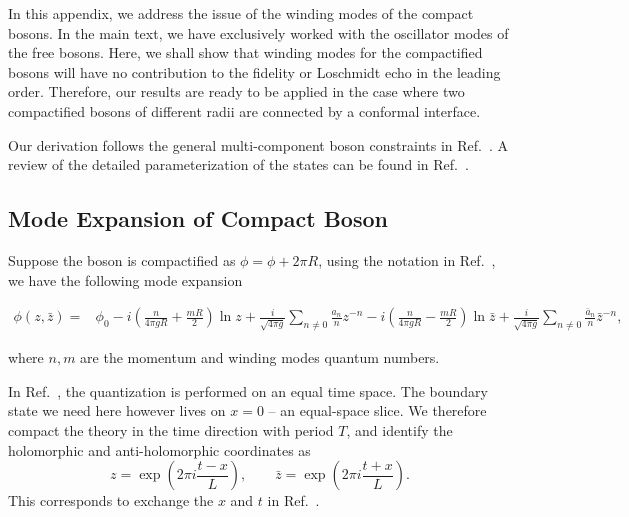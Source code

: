 
In this appendix, we address the issue of the winding modes of the compact bosons. In the main text, we have exclusively worked with the oscillator modes of the free bosons. Here, we shall show that winding modes for the compactified bosons will have no contribution to the fidelity or Loschmidt echo in the leading order. Therefore, our results are ready to be applied in the case where two compactified bosons of different radii are connected by a conformal interface\cite{PhysRevLett.118.136801}. 

Our derivation follows the general multi-component boson constraints in Ref.~. A review of the detailed parameterization of the states can be found in Ref.~. 

\subsection{Mode Expansion of Compact Boson}
Suppose the boson is compactified as $\phi =  \phi + 2\pi R$, using the notation in Ref.~, we have the following mode expansion 
\begin{widetext}
\begin{equation}
\label{eq:boson-mode-exp}
\begin{aligned}
\phi( z, \bar{z}) = &\phi_0 -i \left( \frac{n}{4\pi g  R} + \frac{m R }{2} \right)  \ln z + \frac{i}{\sqrt{4\pi g}} \sum_{n\ne 0 } \frac{a_n}{n} z^{-n } -i \left( \frac{n}{4\pi g R} - \frac{m R }{2} \right)  \ln \bar{z} + \frac{i}{\sqrt{4\pi g}} \sum_{n\ne 0 } \frac{\bar{a}_n}{n} \bar{z}^{-n } ,
\end{aligned}
\end{equation}\end{widetext}
where $n,m$ are the momentum and winding modes quantum numbers. 

In Ref.~, the quantization is performed on an equal time space. The boundary state we need here however lives on $x = 0$ -- an equal-space slice. We therefore compact the theory in the time direction with period $T$, and identify the holomorphic and anti-holomorphic coordinates as 
\begin{equation}
\label{eq:zzbar}
z = \exp( 2 \pi i \frac{t - x}{L}), \qquad \bar{z} = \exp( 2 \pi i \frac{t + x}{L}).
\end{equation}
This corresponds to exchange the $x$ and $t$ in Ref.~. 

